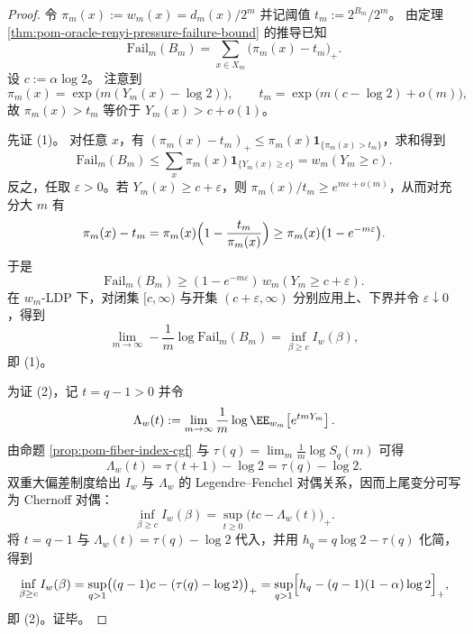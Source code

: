 \begin{proof}
令 \(\pi_m(x):=w_m(x)=d_m(x)/2^m\) 并记阈值 \(t_m:=2^{B_m}/2^m\)。
由定理 \ref{thm:pom-oracle-renyi-pressure-failure-bound} 的推导已知
\[
\mathrm{Fail}_m(B_m)=\sum_{x\in X_m}\bigl(\pi_m(x)-t_m\bigr)_+.
\]
设 \(c:=\alpha\log 2\)。
注意到
\[
\pi_m(x)=\exp\bigl(m(Y_m(x)-\log 2)\bigr),
\qquad
t_m=\exp\bigl(m(c-\log 2)+o(m)\bigr),
\]
故 \(\pi_m(x)>t_m\) 等价于 \(Y_m(x)>c+o(1)\)。
\par
先证 (1)。
对任意 \(x\)，有 \((\pi_m(x)-t_m)_+\le \pi_m(x)\mathbf 1_{\{\pi_m(x)>t_m\}}\)，求和得到
\[
\mathrm{Fail}_m(B_m)\le \sum_x \pi_m(x)\mathbf 1_{\{Y_m(x)\ge c\}}=w_m(Y_m\ge c).
\]
反之，任取 \(\varepsilon>0\)。若 \(Y_m(x)\ge c+\varepsilon\)，则 \(\pi_m(x)/t_m\ge e^{m\varepsilon+o(m)}\)，从而对充分大 \(m\) 有
\[
\pi_m(x)-t_m=\pi_m(x)\Bigl(1-\frac{t_m}{\pi_m(x)}\Bigr)\ge \pi_m(x)\bigl(1-e^{-m\varepsilon}\bigr).
\]
于是
\[
\mathrm{Fail}_m(B_m)\ge (1-e^{-m\varepsilon})\,w_m(Y_m\ge c+\varepsilon).
\]
在 \(w_m\)-LDP 下，对闭集 \([c,\infty)\) 与开集 \((c+\varepsilon,\infty)\) 分别应用上、下界并令 \(\varepsilon\downarrow 0\)，得到
\[
\lim_{m\to\infty}-\frac1m\log \mathrm{Fail}_m(B_m)=\inf_{\beta\ge c} I_w(\beta),
\]
即 (1)。
\par
为证 (2)，记 \(t=q-1>0\) 并令
\[
\Lambda_w(t):=\lim_{m\to\infty}\frac1m\log \EE_{w_m}\!\left[e^{t m Y_m}\right].
\]
由命题 \ref{prop:pom-fiber-index-cgf} 与 \(\tau(q)=\lim_m \frac1m\log S_q(m)\) 可得
\[
\Lambda_w(t)=\tau(t+1)-\log 2=\tau(q)-\log 2.
\]
双重大偏差制度给出 \(I_w\) 与 \(\Lambda_w\) 的 Legendre--Fenchel 对偶关系，因而上尾变分可写为 Chernoff 对偶：
\[
\inf_{\beta\ge c}I_w(\beta)=\sup_{t\ge 0}\bigl(tc-\Lambda_w(t)\bigr)_+.
\]
将 \(t=q-1\) 与 \(\Lambda_w(t)=\tau(q)-\log 2\) 代入，并用 \(h_q=q\log 2-\tau(q)\) 化简，得到
\[
\inf_{\beta\ge c}I_w(\beta)
=\sup_{q>1}\bigl((q-1)c-(\tau(q)-\log 2)\bigr)_+
=\sup_{q>1}\Bigl[h_q-(q-1)(1-\alpha)\log 2\Bigr]_+,
\]
即 (2)。证毕。
\end{proof}

